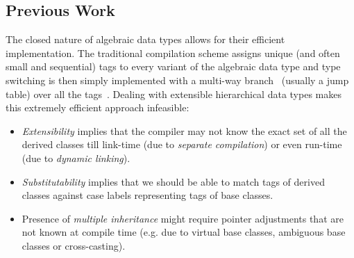 
\subsection{Previous Work}
\label{sec:prev}

The closed nature of algebraic data types allows for their efficient 
implementation. The traditional compilation scheme assigns unique (and often 
small and sequential) tags to every variant of the algebraic data type and type 
switching is then simply implemented with a multi-way branch~\cite{Spuler94} 
(usually a jump table) over all the tags~\cite{Augustsson85}. Dealing with 
extensible hierarchical data types makes this extremely efficient approach 
infeasible:

\begin{itemize}
\setlength{\itemsep}{0pt}
\setlength{\parskip}{0pt}
\item \emph{Extensibility} implies that the compiler may not know the exact set 
      of all the derived classes till link-time (due to \emph{separate compilation}) 
      or even run-time (due to \emph{dynamic linking}).
\item \emph{Substitutability} implies that we should be able to 
      match tags of derived classes against case labels representing tags of 
      base classes.
\item Presence of \emph{multiple inheritance} might require pointer adjustments 
      that are not known at compile time (e.g. due to virtual base classes, 
      ambiguous base classes or cross-casting).
\end{itemize}

%

